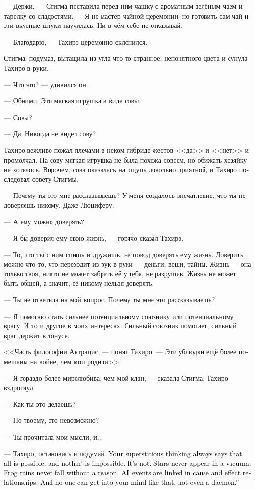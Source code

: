 \documentclass[a4paper,12pt,fleqn]{book}\usepackage{cooltooltips}\usepackage{polyglossia}\setdefaultlanguage[babelshorthands=true]{russian}\setotherlanguage{english}\defaultfontfeatures{Ligatures=TeX,Mapping=tex-text} \usepackage{xcolor}\definecolor{lightgray}{HTML}{bbbbbb}\color{lightgray}\newcommand{\ml}[3]{\textenglish{\textcolor{black}{#3}}}
\newcommand{\textspace}{\vspace{1em}{\centering\Large\bfseries<...>\par}\vspace{1em}}
\begin{document}
{--- Держи, --- Стигма поставила перед ним чашку с ароматным зелёным чаем и тарелку со сладостями.
--- Я не мастер чайной церемонии, но готовить сам чай и эти вкусные штуки научилась.
Ни в чём себе не отказывай.

--- Благодарю, --- Тахиро церемонно склонился.

Стигма, подумав, вытащила из угла что-то странное, непонятного цвета и сунула Тахиро в руки.

--- Что это? --- удивился он.

--- Обними.
Это мягкая игрушка в виде совы.

--- Совы?

--- Да.
Никогда не видел сову?

Тахиро вежливо пожал плечами в неком гибриде жестов <<да>> и <<нет>> и промолчал.
На сову мягкая игрушка не была похожа совсем, но обижать хозяйку не хотелось.
Впрочем, сова оказалась на ощупь довольно приятной, и Тахиро последовал совету Стигмы.

\textspace

--- Почему ты это мне рассказываешь?
У меня создалось впечатление, что ты не доверяешь никому.
Даже Люциферу.

--- А ему можно доверять?

--- Я бы доверил ему свою жизнь, --- горячо сказал Тахиро.

--- То, что ты с ним спишь и дружишь, не повод доверять ему жизнь.
Доверить можно что-то, что переходит из рук в руки --- деньги, вещи, тайны.
Жизнь --- она только твоя, никто не может забрать её у тебя, не разрушив.
Жизнь не может быть общей, а значит, её никому нельзя доверять.

--- Ты не ответила на мой вопрос.
Почему ты мне это рассказываешь?

--- Я помогаю стать сильнее потенциальному союзнику или потенциальному врагу.
И то и другое в моих интересах.
Сильный союзник помогает, сильный враг держит в тонусе.

<<Часть философии Антрацис, --- понял Тахиро.
--- Эти ублюдки ещё более помешаны на войне, чем мои родичи>>.

--- Я гораздо более миролюбива, чем мой клан, --- сказала Стигма.
Тахиро вздрогнул.

--- Как ты это делаешь?

--- По-твоему, это невозможно?

--- Ты прочитала мои мысли, и...

--- Тахиро, остановись и подумай.
\ml{$0$}
{Твоё мифологическое сознание постоянно говорит тебе, что возможно всё, ничего невозможного нет.}
{Your superstitious thinking always says that all is possible, and nothin' is impossible.}
\ml{$0$}
{Это не так.}
{It's not.}
\ml{$0$}
{Звёзды не загораются на пустом месте.}
{Stars never appear in a vacuum.}
\ml{$0$}
{Дожди из лягушек не идут просто так.}
{Frog rains never fall without a reason.}
\ml{$0$}
{Все события связаны причинно-следственными связями.}
{All events are linked in cause and effect relationships.}
\ml{$0$}
{Никто не умеет вот так сразу влезать в чужую голову, даже демон.}
{And no one can get into your mind like that, not even a daemon.''}

}
\end{document}
